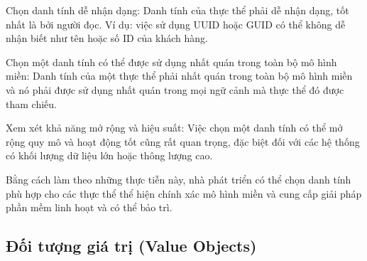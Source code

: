 Chọn danh tính dễ nhận dạng: Danh tính của thực thể phải dễ nhận dạng, tốt nhất là bởi người đọc. Ví dụ: việc sử dụng UUID hoặc GUID có thể không dễ nhận biết như tên hoặc số ID của khách hàng.

Chọn một danh tính có thể được sử dụng nhất quán trong toàn bộ mô hình miền: Danh tính của một thực thể phải nhất quán trong toàn bộ mô hình miền và nó phải được sử dụng nhất quán trong mọi ngữ cảnh mà thực thể đó được tham chiếu.

Xem xét khả năng mở rộng và hiệu suất: Việc chọn một danh tính có thể mở rộng quy mô và hoạt động tốt cũng rất quan trọng, đặc biệt đối với các hệ thống có khối lượng dữ liệu lớn hoặc thông lượng cao.

Bằng cách làm theo những thực tiễn này, nhà phát triển có thể chọn danh tính phù hợp cho các thực thể thể hiện chính xác mô hình miền và cung cấp giải pháp phần mềm linh hoạt và có thể bảo trì.





\subsection{Đối tượng giá trị (Value Objects)}








